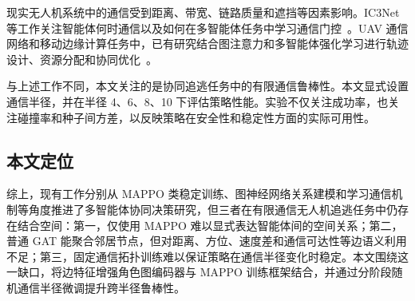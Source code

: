 现实无人机系统中的通信受到距离、带宽、链路质量和遮挡等因素影响。IC3Net 等工作关注智能体何时通信以及如何在多智能体任务中学习通信门控~\cite{singh2018ic3net}。UAV 通信网络和移动边缘计算任务中，已有研究结合图注意力和多智能体强化学习进行轨迹设计、资源分配和协同优化~\cite{feng2024gat_uav_comm,kim2024uav_mec_madrl}。

与上述工作不同，本文关注的是协同追逃任务中的有限通信鲁棒性。本文显式设置通信半径，并在半径 4、6、8、10 下评估策略性能。实验不仅关注成功率，也关注碰撞率和种子间方差，以反映策略在安全性和稳定性方面的实际可用性。

\subsection{本文定位}

综上，现有工作分别从 MAPPO 类稳定训练、图神经网络关系建模和学习通信机制等角度推进了多智能体协同决策研究，但三者在有限通信无人机追逃任务中仍存在结合空间：第一，仅使用 MAPPO 难以显式表达智能体间的空间关系；第二，普通 GAT 能聚合邻居节点，但对距离、方位、速度差和通信可达性等边语义利用不足；第三，固定通信拓扑训练难以保证策略在通信半径变化时稳定。本文围绕这一缺口，将边特征增强角色图编码器与 MAPPO 训练框架结合，并通过分阶段随机通信半径微调提升跨半径鲁棒性。
